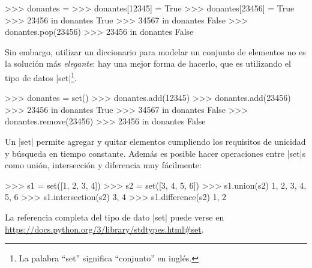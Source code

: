 \begin{subappendices}
\begin{codigo-python-sn}
>>> donantes = {}
>>> donantes[12345] = True
>>> donantes[23456] = True
>>> 23456 in donantes
True
>>> 34567 in donantes
False
>>> donantes.pop(23456)
>>> 23456 in donantes
False
\end{codigo-python-sn}

Sin embargo, utilizar un diccionario para modelar un conjunto de elementos no
es la solución más \emph{elegante}: hay una mejor forma de hacerlo, que es
utilizando el tipo de datos |set|\footnote{La palabra ``set'' significa
``conjunto'' en inglés.}.

\begin{codigo-python-sn}
>>> donantes = set()
>>> donantes.add(12345)
>>> donantes.add(23456)
>>> 23456 in donantes
True
>>> 34567 in donantes
False
>>> donantes.remove(23456)
>>> 23456 in donantes
False
\end{codigo-python-sn}

Un |set| permite agregar y quitar elementos cumpliendo los requisitos de
unicidad y búsqueda en tiempo constante. Además es posible hacer operaciones
entre |set|s como unión, intersección y diferencia muy fácilmente:

\begin{codigo-python-sn}
>>> s1 = set([1, 2, 3, 4])
>>> s2 = set([3, 4, 5, 6])
>>> s1.union(s2)
{1, 2, 3, 4, 5, 6}
>>> s1.intersection(s2)
{3, 4}
>>> s1.difference(s2)
{1, 2}
\end{codigo-python-sn}

La referencia completa del tipo de dato |set| puede verse en
\url{https://docs.python.org/3/library/stdtypes.html#set}.
\end{subappendices}
